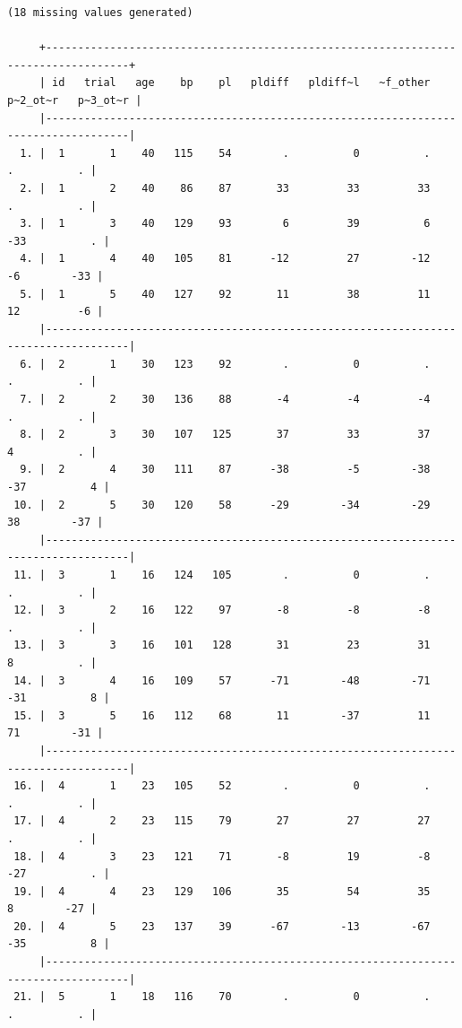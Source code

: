 \documentclass[
]{book}
\begin{document}
\begin{verbatim}
(18 missing values generated)

     +-----------------------------------------------------------------------------------+
     | id   trial   age    bp    pl   pldiff   pldiff~l   ~f_other   p~2_ot~r   p~3_ot~r |
     |-----------------------------------------------------------------------------------|
  1. |  1       1    40   115    54        .          0          .          .          . |
  2. |  1       2    40    86    87       33         33         33          .          . |
  3. |  1       3    40   129    93        6         39          6        -33          . |
  4. |  1       4    40   105    81      -12         27        -12         -6        -33 |
  5. |  1       5    40   127    92       11         38         11         12         -6 |
     |-----------------------------------------------------------------------------------|
  6. |  2       1    30   123    92        .          0          .          .          . |
  7. |  2       2    30   136    88       -4         -4         -4          .          . |
  8. |  2       3    30   107   125       37         33         37          4          . |
  9. |  2       4    30   111    87      -38         -5        -38        -37          4 |
 10. |  2       5    30   120    58      -29        -34        -29         38        -37 |
     |-----------------------------------------------------------------------------------|
 11. |  3       1    16   124   105        .          0          .          .          . |
 12. |  3       2    16   122    97       -8         -8         -8          .          . |
 13. |  3       3    16   101   128       31         23         31          8          . |
 14. |  3       4    16   109    57      -71        -48        -71        -31          8 |
 15. |  3       5    16   112    68       11        -37         11         71        -31 |
     |-----------------------------------------------------------------------------------|
 16. |  4       1    23   105    52        .          0          .          .          . |
 17. |  4       2    23   115    79       27         27         27          .          . |
 18. |  4       3    23   121    71       -8         19         -8        -27          . |
 19. |  4       4    23   129   106       35         54         35          8        -27 |
 20. |  4       5    23   137    39      -67        -13        -67        -35          8 |
     |-----------------------------------------------------------------------------------|
 21. |  5       1    18   116    70        .          0          .          .          . |

\end{verbatim}
\end{document}
